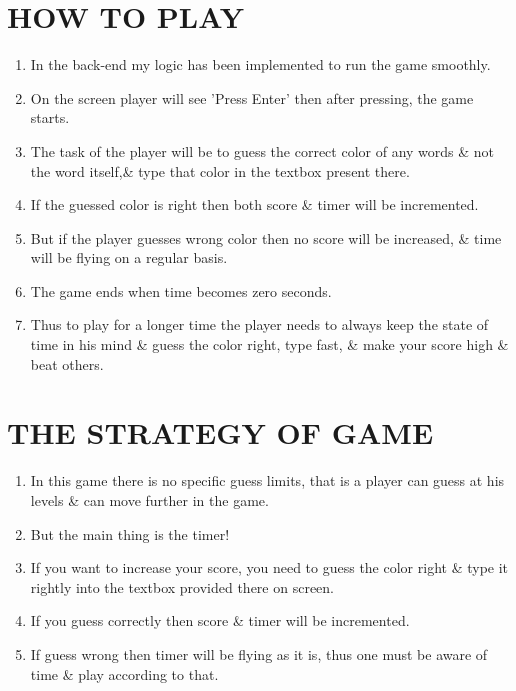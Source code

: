 \documentclass[12pt]{article}
\begin{document}
	\section{HOW TO PLAY}
	\begin{enumerate}
		\item  In the back-end my logic has been implemented to run the game smoothly.
		
		\item  On the screen player will see 'Press Enter' then after pressing, the game starts.
		
		\item The task of the player will be to guess the correct color of any words \& not the word itself,\& type that color in the textbox present there.
		
		\item If the guessed color is right then both score \& timer will be incremented.
		
		\item But if the player guesses wrong color then no score will be increased, \& time will be flying on a regular basis.
		
		\item  The game ends when time becomes zero seconds.
		
		\item  Thus to play for a longer time the player needs to always keep the state of time in his mind \& guess the color right, type fast, \& make your score high \& beat others.
	\end{enumerate}  

\section{THE STRATEGY OF GAME}
\begin{enumerate}
	\item In this game there is no specific guess limits, that is a player can guess at his levels \& can move further in the game.
	
	\item But the main thing is the timer!
	
	\item If you want to increase your score, you need to guess the color right \& type it rightly into the textbox provided there on screen.
	
	\item If you guess correctly then score \& timer will be incremented.
	
	\item If guess wrong then timer will be flying as it is, thus one must be aware of time \& play according to that.
\end{enumerate}
\end{document}
